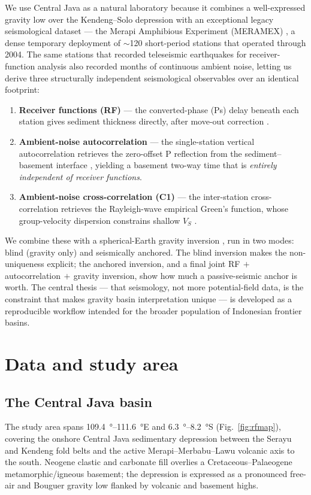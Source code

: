 We use Central Java as a natural laboratory because it combines a well-expressed
gravity low over the Kendeng--Solo depression with an exceptional legacy
seismological dataset --- the Merapi Amphibious Experiment (MERAMEX)
\citep{Wagner2007,Koulakov2007}, a dense temporary deployment of $\sim$120
short-period stations that operated through 2004. The same stations that recorded
teleseismic earthquakes for receiver-function analysis also recorded months of
continuous ambient noise, letting us derive three structurally independent
seismological observables over an identical footprint:
\begin{enumerate}
\item \textbf{Receiver functions (RF)} --- the converted-phase (Ps) delay beneath
each station gives sediment thickness directly, after move-out correction
\citep{Zhu2000,Ligorria1999}.
\item \textbf{Ambient-noise autocorrelation} --- the single-station vertical
autocorrelation retrieves the zero-offset P reflection from the
sediment--basement interface \citep{Claerbout1968,Romero2018}, yielding a
basement two-way time that is \emph{entirely independent of receiver functions}.
\item \textbf{Ambient-noise cross-correlation (C1)} --- the inter-station
cross-correlation retrieves the Rayleigh-wave empirical Green's function, whose
group-velocity dispersion constrains shallow $V_S$ \citep{Shapiro2004,Spica2016}.
\end{enumerate}

We combine these with a spherical-Earth gravity inversion \citep{Uieda2017}, run
in two modes: blind (gravity only) and seismically anchored. The blind inversion
makes the non-uniqueness explicit; the anchored inversion, and a final joint
RF$\,+\,$autocorrelation$\,+\,$gravity inversion, show how much a passive-seismic
anchor is worth. The central thesis --- that seismology, not more potential-field
data, is the constraint that makes gravity basin interpretation unique --- is
developed as a reproducible workflow intended for the broader population of
Indonesian frontier basins.

\section{Data and study area}
\subsection{The Central Java basin}
The study area spans \SIrange{109.4}{111.6}{\degree}E and
\SIrange{6.3}{8.2}{\degree}S (Fig.~\ref{fig:rfmap}), covering the onshore Central
Java sedimentary depression between the Serayu and Kendeng fold belts and the
active Merapi--Merbabu--Lawu volcanic axis to the south. Neogene clastic and
carbonate fill overlies a Cretaceous--Palaeogene metamorphic/igneous basement;
the depression is expressed as a pronounced free-air and Bouguer gravity low
flanked by volcanic and basement highs.

